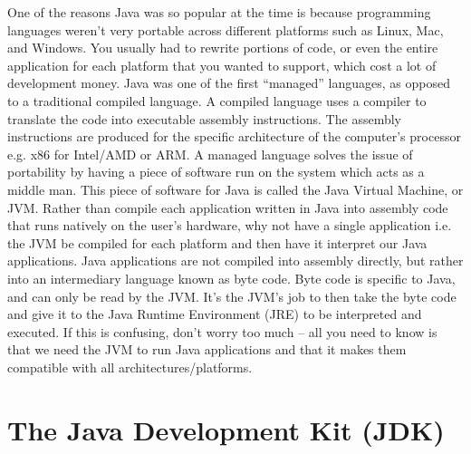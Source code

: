 \documentclass{article}
\begin{document}
One of the reasons Java was so popular at the time is because programming languages weren’t very portable
across different platforms such as Linux, Mac, and Windows. You usually had to rewrite portions of code, or
even the entire application for each platform that you wanted to support, which cost a lot of development
money. Java was one of the first “managed” languages, as opposed to a traditional compiled language. A
compiled language uses a compiler to translate the code into executable assembly instructions. The assembly
instructions are produced for the specific architecture of the computer’s processor e.g. x86 for Intel/AMD or
ARM. A managed language solves the issue of portability by having a piece of software run on the system which
acts as a middle man. This piece of software for Java is called the Java Virtual Machine, or JVM. Rather than
compile each application written in Java into assembly code that runs natively on the user’s hardware, why not
have a single application i.e. the JVM be compiled for each platform and then have it interpret our Java
applications. Java applications are not compiled into assembly directly, but rather into an intermediary
language known as byte code. Byte code is specific to Java, and can only be read by the JVM. It’s the JVM’s
job to then take the byte code and give it to the Java Runtime Environment (JRE) to be interpreted and executed.
If this is confusing, don’t worry too much – all you need to know is that we need the JVM to run Java
applications and that it makes them compatible with all architectures/platforms.

\section{The Java Development Kit (JDK)}
\end{document}
